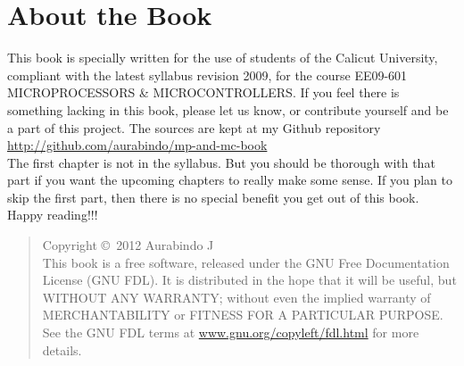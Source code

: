 \documentclass{book}
\begin{document}

\newcommand{\HRule}{\rule{\linewidth}{1mm}}



\pagestyle{headings}
\setcounter{page}{1}

\section*{{\huge About the Book}}



This book is specially written for the use of students of the Calicut University, compliant with the latest syllabus revision 2009, 
for the course EE09-601 MICROPROCESSORS \& MICROCONTROLLERS. If you feel there is something lacking in this book, please let us know, or contribute yourself and be a part of this project. The sources are kept at my Github repository \href{http://github.com/aurabindo/mp-and-mc-book}{http://github.com/aurabindo/mp-and-mc-book}\\[.1cm]

\noindent The first chapter is not in the syllabus. But you should be thorough with that part if you want the upcoming chapters to really make some sense. If you plan to skip the first part, then there is no special benefit you get out of this book. Happy reading!!!
\\[4.5cm]

\begin{quote}

Copyright \copyright\ 2012 Aurabindo J\\[.3cm ]
This book is a free software, released under the GNU Free Documentation License (GNU FDL). It is distributed in the hope that it will be useful, but WITHOUT
ANY WARRANTY; without even the implied warranty of MERCHANTABILITY
or FITNESS FOR A PARTICULAR PURPOSE.  See the GNU FDL terms at \href{www.gnu.org/copyleft/fdl.html}{www.gnu.org/copyleft/fdl.html} for more details.

\end{quote}
\pagebreak



\tableofcontents
\newpage

\setcounter{page}{1}
\end{document}
